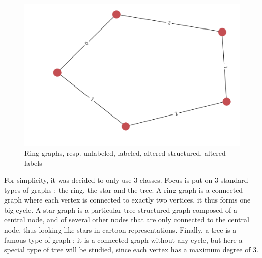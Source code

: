 \documentclass{article}
\theoremstyle{definition}
\begin{document}
\begin{figure}[!htb]
\begin{multicols}{4}
		\includegraphics[width=\linewidth]{data/generated-graphs/ring_altered_labels.png}\par
	\end{multicols}
	\caption{Ring graphs, resp. unlabeled, labeled, altered structured, altered labels}
\end{figure}
For simplicity, it was decided to only use 3 classes. Focus is put on 3 standard types of graphs : the ring, the star and the tree. A ring graph is a connected graph where each vertex is connected to exactly two vertices, it thus forms one big cycle. A star graph is a particular tree-structured graph composed of a central node, and of several other nodes that are only connected to the central node, thus looking like stars in cartoon representations. Finally, a tree is a famous type of graph : it is a connected graph without any cycle, but here a special type of tree will be studied, since each vertex has a maximum degree of 3.
\end{document}
